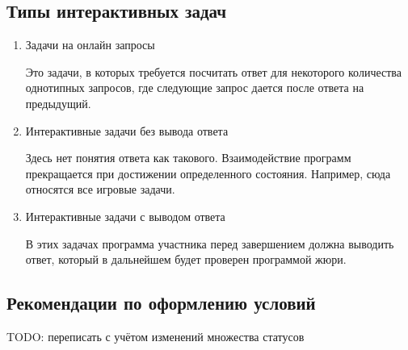 \subsection{Типы интерактивных задач}
\begin{enumerate}
    \item Задачи на онлайн запросы

        Это задачи, в которых требуется посчитать ответ для некоторого количества однотипных запросов,
        где следующие запрос дается после ответа на предыдущий.

    \item Интерактивные задачи без вывода ответа

        Здесь нет понятия ответа как такового. Взаимодействие программ прекращается при достижении определенного состояния. Например, сюда относятся все игровые задачи.

    \item Интерактивные задачи с выводом ответа

        В этих задачах программа участника перед завершением должна выводить ответ,
        который в дальнейшем будет проверен программой жюри.
\end{enumerate}

\subsection{Рекомендации по оформлению условий}
TODO: переписать с учётом изменений множества статусов

